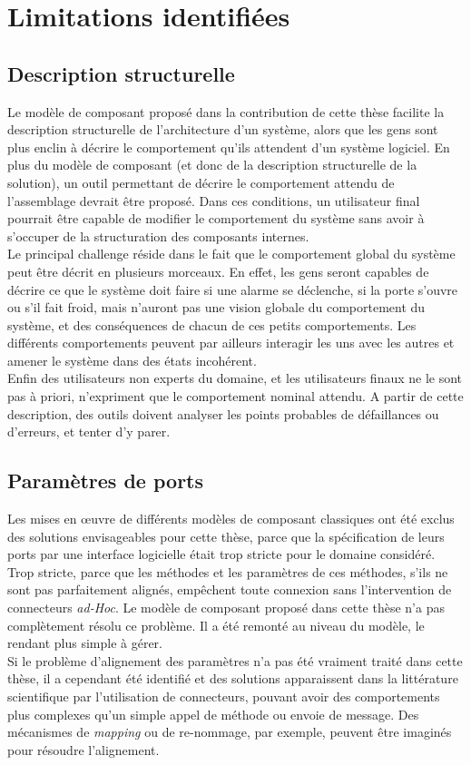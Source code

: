 \section{Limitations identifiées}

\subsection{Description structurelle}

Le modèle de composant proposé dans la contribution de cette thèse facilite la description structurelle de l'architecture d'un système, alors que les gens sont plus enclin à décrire le comportement qu'ils attendent d'un système logiciel. En plus du modèle de composant (et donc de la description structurelle de la solution), un outil permettant de décrire le comportement attendu de l'assemblage devrait être proposé. Dans ces conditions, un utilisateur final pourrait être capable de modifier le comportement du système sans avoir à s'occuper de la structuration des composants internes.\\
Le principal challenge réside dans le fait que le comportement global du système peut être décrit en plusieurs morceaux. En effet, les gens seront capables de décrire ce que le système doit faire si une alarme se déclenche, si la porte s'ouvre ou s'il fait froid, mais n'auront pas une vision globale du comportement du système, et des conséquences de chacun de ces petits comportements. Les différents comportements peuvent par ailleurs interagir les uns avec les autres et amener le système dans des états incohérent.\\
Enfin des utilisateurs non experts du domaine, et les utilisateurs finaux ne le sont pas à priori, n'expriment que le comportement nominal attendu. A partir de cette description, des outils doivent analyser les points probables de défaillances ou d'erreurs, et tenter d'y parer.

\subsection{Paramètres de ports}
Les mises en \oe uvre de différents modèles de composant classiques ont été exclus des solutions envisageables pour cette thèse, parce que la spécification de leurs ports par une interface logicielle était trop stricte pour le domaine considéré. Trop stricte, parce que les méthodes et les paramètres de ces méthodes, s'ils ne sont pas parfaitement alignés, empêchent toute connexion sans l'intervention de connecteurs {\it ad-Hoc}. Le modèle de composant proposé dans cette thèse n'a pas complètement résolu ce problème. Il a été remonté au niveau du modèle, le rendant plus simple à gérer.\\
Si le problème d'alignement des paramètres n'a pas été vraiment traité dans cette thèse, il a cependant été identifié et des solutions apparaissent dans la littérature scientifique par l'utilisation de connecteurs, pouvant avoir des comportements plus complexes qu'un simple appel de méthode ou envoie de message. Des mécanismes de {\it mapping} ou de re-nommage, par exemple, peuvent être imaginés pour résoudre l'alignement.%



